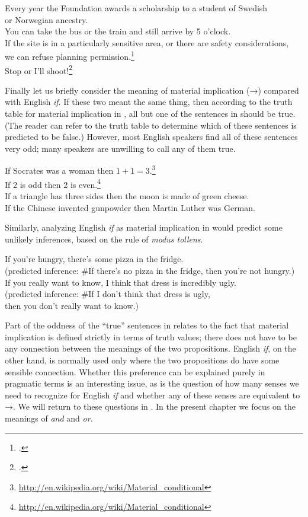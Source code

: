 \ea \label{ex:9.5}
\ea Every year the Foundation awards a scholarship to a student of Swedish\\
  or Norwegian ancestry.\\
\ex You can take the bus or the train and still arrive by 5 o’clock.\\
\ex If the site is in a particularly sensitive area, or there are safety considerations,\\
  we can refuse planning permission.\footnote{\citet[113]{Saeed2009}.}\\
\ex Stop or I’ll shoot!\footnote{\citet[113]{Saeed2009}.}
                       \z
\z


Finally let us briefly consider the meaning of material implication (→) compared with English \textit{if}. If these two meant the same thing, then according to the truth table for material implication in , all but one of the sentences in  should be true. (The reader can refer to the truth table to determine which of these sentences is predicted to be false.) However, most English speakers find all of these sentences very odd; many speakers are unwilling to call any of them true.


\ea \label{ex:9.6}
\ea If Socrates was a woman then $1+1=3$.\footnote{\url{http://en.wikipedia.org/wiki/Material_conditional}} \\
\ex If 2 is odd then 2 is even.\footnote{\url{http://en.wikipedia.org/wiki/Material_conditional}}\\
\ex If a triangle has three sides then the moon is made of green cheese.\\
\ex If the Chinese invented gunpowder then Martin Luther was German.
                       \z
\z


Similarly, analyzing English \textit{if} as material implication in  would predict some unlikely inferences, based on the rule of \textit{modus tollens}.


\ea \label{ex:9.7}
\ea If you’re hungry, there’s some pizza in the fridge.\\
  (predicted inference: \#If there’s no pizza in the fridge, then you’re not hungry.)\\
\ex If you really want to know, I think that dress is incredibly ugly.\\
  (predicted inference: \#If I don’t think that dress is ugly,\\
    then you don’t really want to know.)
                       \z
\z


Part of the oddness of the “true” sentences in  relates to the fact that material implication is defined strictly in terms of truth values; there does not have to be any connection between the meanings of the two propositions. English \textit{if}, on the other hand, is normally used only where the two propositions do have some sensible connection. Whether this preference can be explained purely in pragmatic terms is an interesting issue, as is the question of how many senses we need to recognize for English \textit{if} and whether any of these senses are equivalent to →. We will return to these questions in . In the present chapter we focus on the meanings of \textit{and} and \textit{or}.


